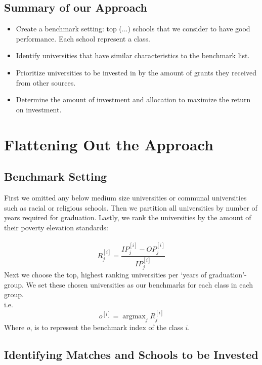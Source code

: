 \documentclass[12pt]{article}
\newcommand{\argmax}{\mathop{\mathrm{argmax}}}
\begin{document}
	\subsection{Summary of our Approach}
		\begin{itemize}
		\item Create a benchmark setting: top (...) schools that we consider to have good performance. Each school represent a class.  
		\item Identify universities that have similar characteristics to the benchmark list. 
		\item Prioritize universities to be invested in by the amount of grants they received from other sources.
		\item Determine the amount of investment and allocation to maximize the return on investment. 
		\end{itemize}
				 
\section{Flattening Out the Approach}
	\subsection{Benchmark Setting}
	
	First we omitted any below medium size universities or communal universities such as racial or religious schools. Then we partition all universities by number of years required for graduation. Lastly, we rank the universities by the amount of their poverty elevation standards: \\ \\ 
	$$
		R_j^{[i]}=\frac{IP_j^{[i]}-OP_j^{[i]}}{IP_j^{[i]}}
	$$  
	Next we choose the top, highest ranking universities per `years of graduation'-group. We set these chosen universities as our benchmarks for each class in each group.\\
	
	i.e.
	$$
		o^{[i]} = \argmax_{j} R_j^{[i]}
	$$
	Where $o$, is to represent the benchmark index of the class $i$.

	\subsection{Identifying Matches and Schools to be Invested}
	
\end{document}
